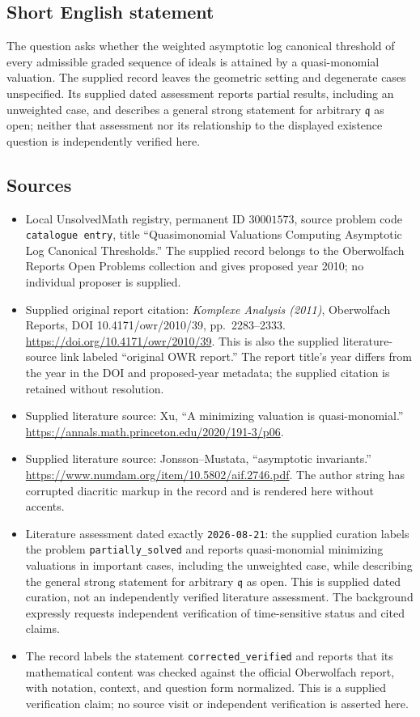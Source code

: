 \documentclass[11pt]{article}
\begin{document}
\subsection{Short English statement}
The question asks whether the weighted asymptotic log canonical threshold of every admissible graded sequence of ideals is attained by a quasi-monomial valuation. The supplied record leaves the geometric setting and degenerate cases unspecified. Its supplied dated assessment reports partial results, including an unweighted case, and describes a general strong statement for arbitrary \(\mathfrak q\) as open; neither that assessment nor its relationship to the displayed existence question is independently verified here.
\subsection{Sources}
\begin{itemize}
\item Local UnsolvedMath registry, permanent ID \(30001573\), source problem code \texttt{catalogue entry}, title ``Quasimonomial Valuations Computing Asymptotic Log Canonical Thresholds.'' The supplied record belongs to the Oberwolfach Reports Open Problems collection and gives proposed year 2010; no individual proposer is supplied.
\item Supplied original report citation: \emph{Komplexe Analysis (2011)}, Oberwolfach Reports, DOI 10.4171/owr/2010/39, pp.\ 2283--2333. \url{https://doi.org/10.4171/owr/2010/39}. This is also the supplied literature-source link labeled ``original OWR report.'' The report title's year differs from the year in the DOI and proposed-year metadata; the supplied citation is retained without resolution.
\item Supplied literature source: Xu, ``A minimizing valuation is quasi-monomial.'' \url{https://annals.math.princeton.edu/2020/191-3/p06}.
\item Supplied literature source: Jonsson--Mustata, ``asymptotic invariants.'' \url{https://www.numdam.org/item/10.5802/aif.2746.pdf}. The author string has corrupted diacritic markup in the record and is rendered here without accents.
\item Literature assessment dated exactly \texttt{2026-08-21}: the supplied curation labels the problem \texttt{partially\_solved} and reports quasi-monomial minimizing valuations in important cases, including the unweighted case, while describing the general strong statement for arbitrary \(\mathfrak q\) as open. This is supplied dated curation, not an independently verified literature assessment. The background expressly requests independent verification of time-sensitive status and cited claims.
\item The record labels the statement \texttt{corrected\_verified} and reports that its mathematical content was checked against the official Oberwolfach report, with notation, context, and question form normalized. This is a supplied verification claim; no source visit or independent verification is asserted here.
\end{itemize}
\end{document}
